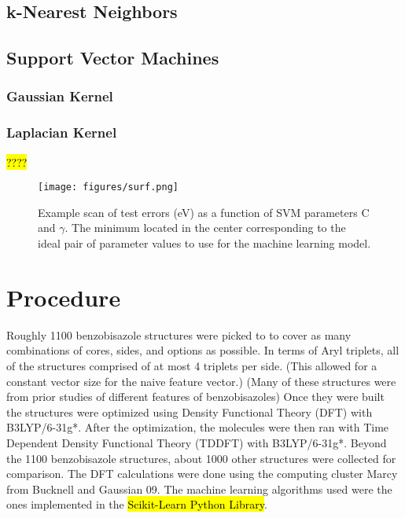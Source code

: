 \documentclass[10pt]{article}
\begin{document}
\subsection{k-Nearest Neighbors}
\subsection{Support Vector Machines}
\subsubsection{Gaussian Kernel}
\subsubsection{Laplacian Kernel}
\hl{????}



 \begin{figure}[H]
   \begin{center}
     \texttt{[image: figures/surf.png]}
   \end{center}
   \caption{Example scan of test errors (eV) as a function of SVM parameters C and $\gamma$. The minimum located in the center corresponding to the ideal pair of parameter values to use for the machine learning model.}
   \label{fig:scan}
 \end{figure}

\section{Procedure}

Roughly 1100 benzobisazole structures were picked to to cover as many combinations of cores, sides, and options as possible. In terms of Aryl triplets, all of the structures comprised of at most 4 triplets per side. (This allowed for a constant vector size for the naive feature vector.) (Many of these structures were from prior studies of different features of benzobisazoles) Once they were built the structures were optimized using Density Functional Theory (DFT) with B3LYP/6-31g*. After the optimization, the molecules were then ran with Time Dependent Density Functional Theory (TDDFT) with B3LYP/6-31g*. Beyond the 1100 benzobisazole structures, about 1000 other structures were collected for comparison. The DFT calculations were done using the computing cluster Marcy from Bucknell and Gaussian 09. The machine learning algorithms used were the ones implemented in the \hl{Scikit-Learn Python Library}.
\end{document}
